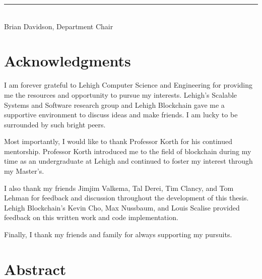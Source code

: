 \documentclass[9pt]{extreport}
\begin{document}
\begin{flushright}
\rule{3in}{0.4pt}\\
Brian Davidson, Department Chair
\end{flushright}

\clearpage

\chapter*{Acknowledgments}

\begingroup
\huge
\doublespacing
I am forever grateful to Lehigh Computer Science and Engineering for providing me the resources and opportunity to pursue my interests.  Lehigh's Scalable Systems and Software research group and Lehigh Blockchain gave me a supportive environment to discuss ideas and make friends.  I am lucky to be surrounded by such bright peers.

Most importantly, I would like to thank Professor Korth for his continued mentorship.  Professor Korth introduced me to the field of blockchain during my time as an undergraduate at Lehigh and continued to foster my interest through my Master's.

I also thank my friends Jimjim Valkema, Tal Derei, Tim Clancy, and Tom Lehman for feedback and discussion throughout the development of this thesis.  Lehigh Blockchain's Kevin Cho, Max Nussbaum, and Louis Scalise provided feedback on this written work and code implementation.

Finally, I thank my friends and family for always supporting my pursuits.

\endgroup

\clearpage

\renewcommand{\contentsname}{Table of Contents}
\tableofcontents
\clearpage

\listoftables
\clearpage

\listoffigures
\clearpage

\setcounter{page}{1}
\chapter*{Abstract}
\doublespacing
\end{document}
